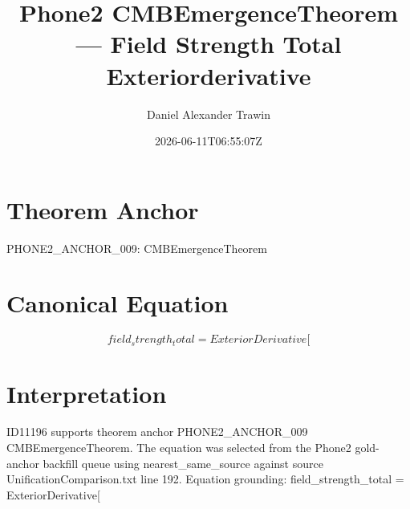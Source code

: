 \documentclass[11pt]{article}
\title{Phone2 CMBEmergenceTheorem — Field Strength Total Exteriorderivative}
\author{Daniel Alexander Trawin}
\date{2026-06-11T06:55:07Z}
\begin{document}
\maketitle
\section*{Theorem Anchor}
PHONE2_ANCHOR_009: CMBEmergenceTheorem
\section*{Canonical Equation}
\[
field_strength_total = ExteriorDerivative[
\]
\section*{Interpretation}
ID11196 supports theorem anchor PHONE2_ANCHOR_009 CMBEmergenceTheorem. The equation was selected from the Phone2 gold-anchor backfill queue using nearest_same_source against source UnificationComparison.txt line 192. Equation grounding: field_strength_total = ExteriorDerivative[
\end{document}
